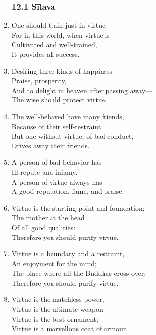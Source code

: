 \documentclass[10pt, openany]{book}
\begin{document}
\begin{enumerate}
\subsubsection*{12.1 Sīlava}

\item One should train just in virtue,\\
For in this world, when virtue is\\
Cultivated and well-trained,\\
It provides all success.

\item Desiring three kinds of happiness—\\
Praise, prosperity,\\
And to delight in heaven after passing away—\\
The wise should protect virtue.

\item The well-behaved have many friends,\\
Because of their self-restraint.\\
But one without virtue, of bad conduct,\\
Drives away their friends.

\item A person of bad behavior has\\
Ill-repute and infamy.\\
A person of virtue always has\\
A good reputation, fame, and praise.

\item Virtue is the starting point and foundation;\\
The mother at the head\\
Of all good qualities:\\
Therefore you should purify virtue.

\item Virtue is a boundary and a restraint,\\
An enjoyment for the mind;\\
The place where all the Buddhas cross over:\\
Therefore you should purify virtue.

\item Virtue is the matchless power;\\
Virtue is the ultimate weapon;\\
Virtue is the best ornament;\\
Virtue is a marvellous coat of armour.


\end{enumerate}
\end{document}
